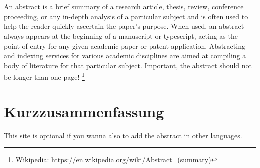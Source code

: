 \chapter*{\LangAbstract}
An abstract is a brief summary of a research article, thesis, review, conference proceeding, or any in-depth analysis of a particular subject and is often used to help the reader quickly ascertain the paper's purpose.
When used, an abstract always appears at the beginning of a manuscript or typescript, acting as the point-of-entry for any given academic paper or patent application. Abstracting and indexing services for various academic disciplines are aimed at compiling a body of literature for that particular subject.
Important, the abstract should not be longer than one page!
\footnote{Wikipedia: \url{https://en.wikipedia.org/wiki/Abstract_(summary)}}
\chapter*{Kurzzusammenfassung}
This site is optional if you wanna also to add the abstract in other languages.